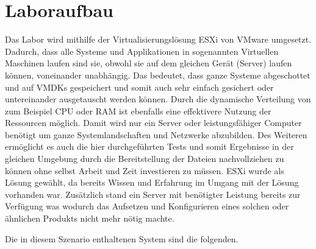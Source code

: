 \section{Laboraufbau}
    Das Labor wird mithilfe der Virtualisierungslösung ESXi %
    von VMware umgesetzt. Dadurch, dass alle Systeme und Applikationen in sogenannten Virtuellen Maschinen laufen sind sie, obwohl sie auf dem gleichen Gerät (Server) laufen können, voneinander unabhängig. Das bedeutet, dass ganze Systeme abgeschottet und auf \ac{VMDK}s gespeichert und somit auch sehr einfach gesichert oder untereinander ausgetauscht werden können. Durch die dynamische Verteilung von zum Beispiel CPU oder RAM ist ebenfalls eine effektivere Nutzung der Ressourcen möglich. Damit wird nur ein Server oder leistungsfähiger Computer benötigt um ganze Systemlandschaften und Netzwerke abzubilden. Des Weiteren ermöglicht es auch die hier durchgeführten Tests und somit Ergebnisse in der gleichen Umgebung durch die Bereitstellung der Dateien nachvollziehen zu können ohne selbst Arbeit und Zeit investieren zu müssen.
    ESXi wurde als Lösung gewählt, da bereits Wissen und Erfahrung im Umgang mit der Lösung vorhanden war. Zusätzlich stand ein Server mit benötigter Leistung bereits zur Verfügung was wodurch das Aufsetzen und Konfigurieren eines solchen oder ähnlichen Produkts nicht mehr nötig machte.
    
    Die in diesem Szenario enthaltenen System sind die folgenden.
    
